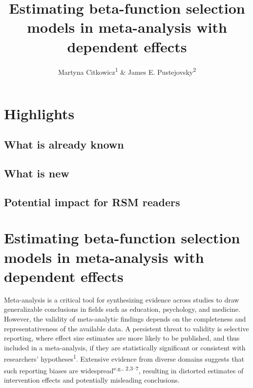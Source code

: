 \documentclass[
  american,
  man, donotrepeattitle,floatsintext]{apa7}
\title{Estimating beta-function selection models in meta-analysis with dependent effects}
\author{Martyna Citkowicz\textsuperscript{1} \& James E. Pustejovsky\textsuperscript{2}}
\date{}
\affiliation{\vspace{0.5cm}\textsuperscript{1} American Institutes for Research\\\textsuperscript{2} University of Wisconsin-Madison}
\begin{document}
\maketitle

\section*{Highlights}\label{highlights}

\subsection*{What is already known}\label{what-is-already-known}

\subsection*{What is new}\label{what-is-new}

\subsection*{Potential impact for RSM readers}\label{potential-impact-for-rsm-readers}

\newpage

\section{Estimating beta-function selection models in meta-analysis with dependent effects}\label{introduction}

Meta-analysis is a critical tool for synthesizing evidence across studies to draw generalizable conclusions in fields such as education, psychology, and medicine. However, the validity of meta-analytic findings depends on the completeness and representativeness of the available data. A persistent threat to validity is selective reporting, where effect size estimates are more likely to be published, and thus included in a meta-analysis, if they are statistically significant or consistent with researchers' hypotheses\textsuperscript{1}. Extensive evidence from diverse domains suggests that such reporting biases are widespread\textsuperscript{e.g., 2,3--7}, resulting in distorted estimates of intervention effects and potentially misleading conclusions.
\end{document}
